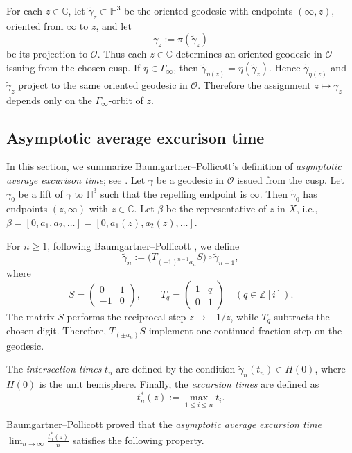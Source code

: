 \documentclass[11pt]{amsart}
\theoremstyle{plain}
\theoremstyle{definition}
\renewcommand\~{\tilde}%
\numberwithin{equation}{section}
\begin{document}
\medskip

For each $z \in \mathbb C$, let $\widetilde\gamma_z\subset \mathbb H^3$ be the oriented geodesic with
endpoints $(\infty,z)$, oriented from $\infty$ to $z$, and let
$$
\gamma_z:=\pi(\widetilde\gamma_z)
$$
be its projection to $\mathcal O$. Thus each $z\in \mathbb C$ determines an oriented geodesic
in $\mathcal O$ issuing from the chosen cusp. If $\eta\in \Gamma_\infty$, then $\widetilde\gamma_{\eta(z)}=\eta(\widetilde\gamma_z)$. Hence
$\widetilde\gamma_{\eta(z)}$ and $\widetilde\gamma_z$ project to the same oriented geodesic in $\mathcal O$.
Therefore the assignment $z \mapsto \gamma_z$
depends only on the $\Gamma_\infty$-orbit of $z$.

\subsection{Asymptotic average excurison time}
In this section, we summarize Baumgartner--Pollicott's definition of {\it asymptotic average excurison time}; see \cite[Section 5]{baumgartnerP}.
Let $\gamma$ be a geodesic in $\mathcal{O}$ issued from the cusp.
Let $\tilde\gamma_0$ be a lift of $\gamma$ to $\mathbb H^3$ such that the repelling endpoint is $\infty$. 
Then $\tilde\gamma_0$ has endpoints $(z, \infty)$ with $z \in \mathbb C$. Let $\beta$ be the representative of $z$ in $X$, i.e., $\beta= [0,a_1,a_2,\dots] = [0,a_1(z),a_2(z),\dots].$

For $n \ge 1$, following Baumgartner--Pollicott \cite[Section 5.1]{baumgartnerP}, we define
$$
\tilde\gamma_n
:=
\bigl(T_{(-1)^{n-1}a_n}S\bigr)\circ \tilde\gamma_{n-1},
$$
where
$$
S=\begin{pmatrix}
0 & 1\\
-1 & 0
\end{pmatrix},
\qquad
T_q=\begin{pmatrix}
1 & q\\
0 & 1
\end{pmatrix}
\quad (q\in \mathbb Z[i]).
$$
The matrix $S$ performs the reciprocal step $z \mapsto -1/z$, while $T_q$ subtracts the chosen digit. Therefore, $T_{(\pm a_n)}S$ implement one continued-fraction step on the geodesic.

\medskip

The {\it intersection times} $t_n$ are defined by the condition $\tilde\gamma_n(t_n)\in H(0)$,
where $H(0)$ is the unit hemisphere.
Finally, the {\it excursion times} are defined as $$t_n^*(z):=\max_{1\le i\le n} t_i.$$

Baumgartner--Pollicott proved that the {\it asymptotic average excursion time} $\lim_{n \to \infty}\frac{t_n^*(z)}{n}$ satisfies the following property.
\end{document}
